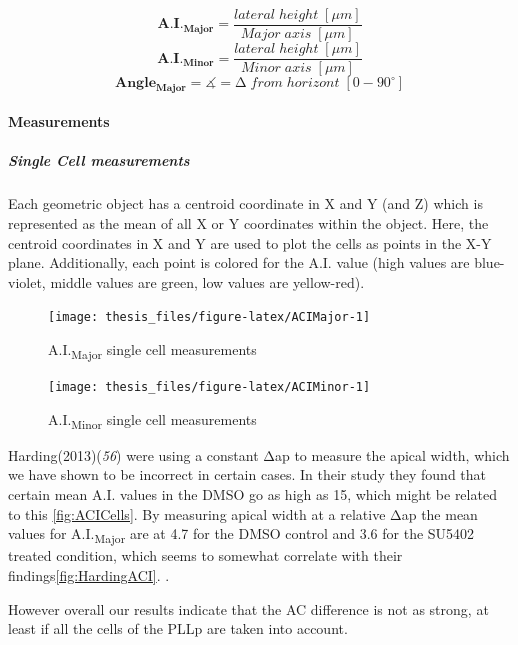 \documentclass[11pt,singlespacinge,twoside]{reedthesis} %
\begin{document}
\[\mathbf{A.I._{Major}} = \frac{lateral\;height\;[\mu m]}{Major\;axis\;[\mu m]}\]
\[\mathbf{A.I._{Minor}} = \frac{lateral\;height\;[\mu m]}{Minor\;axis\;[\mu m]}\]
\[\mathbf{Angle_{Major}} = \measuredangle = \mathrm{\Delta}\;from\;horizont\;[0-90^\circ]\]

\hypertarget{ACI-Dis}{%
\paragraph{Measurements}\label{ACI-Dis}}

\hypertarget{ACI-singlecell}{%
\subparagraph{Single Cell measurements}\label{ACI-singlecell}}

Each geometric object has a centroid coordinate in X and Y (and Z) which is represented as the mean of all X or Y coordinates within the object. Here, the centroid coordinates in X and Y are used to plot the cells as points in the X-Y plane. Additionally, each point is colored for the A.I. value (high values are blue-violet, middle values are green, low values are yellow-red).


\begin{figure}

{\centering \texttt{[image: thesis\_files/figure-latex/ACIMajor-1]} 

}

\caption{A.I.\textsubscript{Major} single cell measurements}\label{fig:ACIMajor}
\end{figure}

\begin{figure}

{\centering \texttt{[image: thesis\_files/figure-latex/ACIMinor-1]} 

}

\caption{A.I.\textsubscript{Minor} single cell measurements}\label{fig:ACIMinor}
\end{figure}
Harding(2013)(\emph{56}) were using a constant \(\mathrm{\Delta}\)ap to measure the apical width, which we have shown to be incorrect in certain cases. In their study they found that certain mean A.I. values in the DMSO go as high as 15, which might be related to this \ref{fig:ACICells}.
By measuring apical width at a relative \(\mathrm{\Delta}\)ap the mean values for A.I.\textsubscript{Major} are at 4.7 for the DMSO control and 3.6 for the SU5402 treated condition, which seems to somewhat correlate with their findings\ref{fig:HardingACI}. .

However overall our results indicate that the AC difference is not as strong, at least if all the cells of the PLLp are taken into account.
\end{document}
